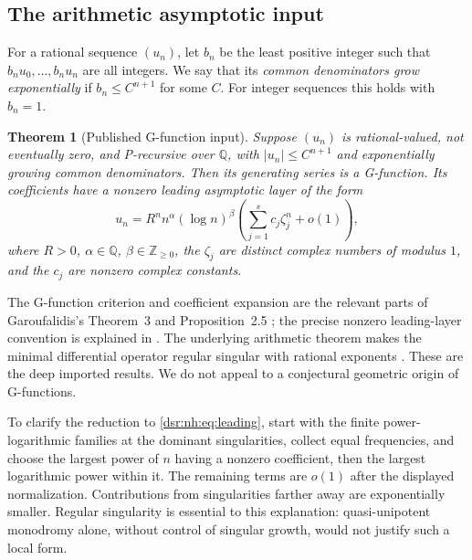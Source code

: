 \documentclass[11pt,a4paper]{article}
\numberwithin{equation}{section}
\newtheorem{theorem}{Theorem}[section]
\theoremstyle{definition}
\theoremstyle{remark}
\newcommand{\Z}{\mathbb Z}
\newcommand{\Q}{\mathbb Q}
\theoremstyle{definition}
\theoremstyle{plain}
\begin{document}
\subsection{The arithmetic asymptotic input}
For a rational sequence $(u_n)$, let $b_n$ be the least positive integer
such that $b_nu_0,\ldots,b_nu_n$ are all integers. We say that its
\emph{common denominators grow exponentially} if $b_n\le C^{n+1}$ for some
$C$. For integer sequences this holds with $b_n=1$.

\begin{theorem}[Published G-function input]
\label{dsr:nh:thm:ginput}
Suppose $(u_n)$ is rational-valued, not eventually zero, and P-recursive
over $\Q$, with $|u_n|\le C^{n+1}$ and exponentially growing common
denominators. Then its generating series is a G-function. Its coefficients
have a nonzero leading asymptotic layer of the form
\begin{equation}
u_n=R^n n^\alpha(\log n)^\beta
\left(\sum_{j=1}^{s}c_j\zeta_j^n+o(1)\right),
\label{dsr:nh:eq:leading}
\end{equation}
where $R>0$, $\alpha\in\Q$, $\beta\in\Z_{\ge0}$, the $\zeta_j$ are distinct
complex numbers of modulus $1$, and the $c_j$ are nonzero complex constants.
\end{theorem}
The G-function criterion and coefficient expansion are the relevant parts
of Garoufalidis's Theorem~3 and Proposition~2.5 \cite{Gar09}; the precise
nonzero leading-layer convention is explained in \cite{Gar11}. The underlying
arithmetic theorem makes the minimal differential operator regular singular
with rational exponents \cite{Andre}. These are the deep imported results.
We do not appeal to a conjectural geometric origin of G-functions.

To clarify the reduction to \eqref{dsr:nh:eq:leading}, start with the finite
power-logarithmic families at the dominant singularities, collect equal
frequencies, and choose the largest power of $n$ having a nonzero
coefficient, then the largest logarithmic power within it. The remaining
terms are $o(1)$ after the displayed normalization. Contributions from
singularities farther away are exponentially smaller. Regular singularity
is essential to this explanation: quasi-unipotent monodromy alone, without
control of singular growth, would not justify such a local form.
\end{document}
